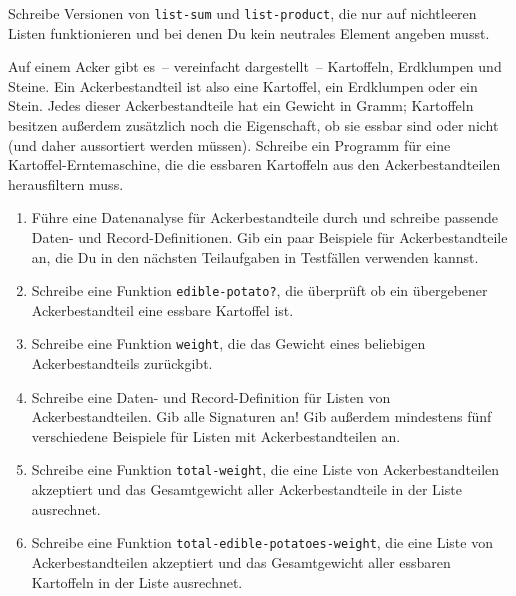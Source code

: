 \begin{aufgabeinline}
  Schreibe Versionen von \lstinline{list-sum} und
  \lstinline{list-product}, die nur auf nichtleeren Listen
  funktionieren und bei denen Du kein neutrales Element angeben musst.
\end{aufgabeinline}

\begin{aufgabe}
   Auf einem Acker gibt es~-- vereinfacht
  dargestellt~-- Kartoffeln, Erdklumpen und Steine.  Ein
  Ackerbestandteil ist also eine Kartoffel, ein Erdklumpen oder ein
  Stein.  Jedes dieser Ackerbestandteile hat ein Gewicht in Gramm;
  Kartoffeln besitzen außerdem zusätzlich noch die Eigenschaft, ob sie
  essbar sind oder nicht (und daher aussortiert werden müssen).
  Schreibe ein Programm für eine Kartoffel-Erntemaschine, die die
  essbaren Kartoffeln aus den Ackerbestandteilen herausfiltern muss.

  \begin{enumerate}
  \item Führe eine Datenanalyse für
    Ackerbestandteile durch und schreibe passende Daten- und
    Record-Definitionen.  Gib ein paar Beispiele für
    Ackerbestandteile an, die Du in den nächsten Teilaufgaben in
    Testfällen verwenden kannst.

  \item Schreibe eine Funktion
    \lstinline{edible-potato?}, die überprüft ob ein übergebener
    Ackerbestandteil eine essbare Kartoffel ist.

  \item Schreibe eine Funktion \lstinline{weight}, 
    die das Gewicht eines beliebigen Ackerbestandteils zurückgibt.

  \item Schreibe eine Daten- und Record-Definition
    für Listen von Ackerbestandteilen.  Gib alle Signaturen an!
    Gib außerdem mindestens fünf verschiedene Beispiele für Listen
    mit Ackerbestandteilen an.

  \item Schreibe eine Funktion \lstinline{total-weight},
    die eine Liste von Ackerbestandteilen akzeptiert und das Gesamtgewicht
    aller Ackerbestandteile in der Liste ausrechnet.

  \item Schreibe eine Funktion
    \lstinline{total-edible-potatoes-weight}, die eine Liste von Ackerbestandteilen
    akzeptiert und das Gesamtgewicht aller essbaren Kartoffeln in der Liste
    ausrechnet.


\end{enumerate}
\end{aufgabe}
